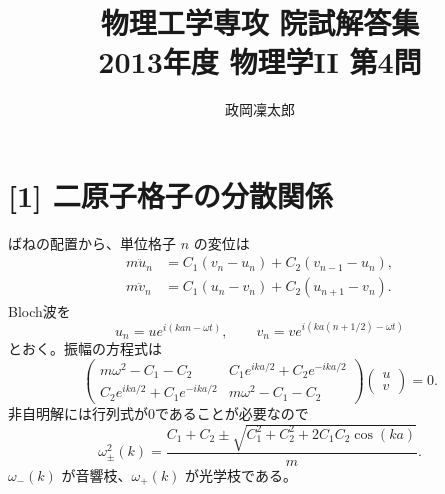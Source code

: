 \documentclass[11pt,a4paper]{article}
\title{物理工学専攻 院試解答集\\2013年度 物理学II 第4問}
\author{政岡凜太郎}
\date{}
\begin{document}
\maketitle

\section*{[1] 二原子格子の分散関係}
ばねの配置から、単位格子 $n$ の変位は
\begin{align}
 m\ddot u_n&=C_1(v_n-u_n)+C_2(v_{n-1}-u_n),\\
 m\ddot v_n&=C_1(u_n-v_n)+C_2(u_{n+1}-v_n).
\end{align}
Bloch波を
\begin{equation}
 u_n=u e^{i(kan-\omega t)},\qquad
 v_n=v e^{i(ka(n+1/2)-\omega t)}
\end{equation}
とおく。振幅の方程式は
\begin{equation}
 \begin{pmatrix}
 m\omega^2-C_1-C_2 & C_1e^{ika/2}+C_2e^{-ika/2}\\
 C_2e^{ika/2}+C_1e^{-ika/2} & m\omega^2-C_1-C_2
 \end{pmatrix}
 \begin{pmatrix}u\\v\end{pmatrix}=0.
\end{equation}
非自明解には行列式が0であることが必要なので
\begin{equation}
 \boxed{\omega_{\pm}^2(k)=\frac{C_1+C_2\pm
 \sqrt{C_1^2+C_2^2+2C_1C_2\cos(ka)}}{m}.}
\end{equation}
$\omega_-(k)$ が音響枝、$\omega_+(k)$ が光学枝である。
\end{document}

